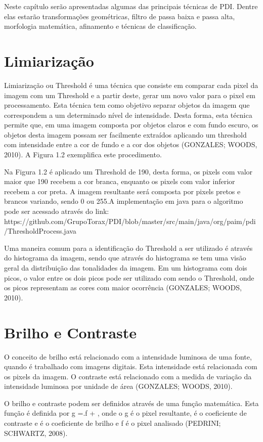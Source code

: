 \documentclass[
	12pt,				%
	oneside,			%
	a4paper,			%
	english,			%
	french,				%
	spanish,			%
	brazil,				%
	]{abntex2}
\begin{document}
Neste capítulo serão apresentadas algumas das principais técnicas de PDI. Dentre elas estarão transformações geométricas, filtro de passa baixa e passa alta, morfologia matemática, afinamento e técnicas de classificação.
\section{Limiarização}

Limiarização ou Threshold é uma técnica que consiste em comparar cada pixel da imagem com um Threshold e a partir deste, gerar um novo valor para o pixel em processamento. Esta técnica tem como objetivo separar objetos da imagem que correspondem a um determinado nível de intensidade. Desta forma, esta técnica permite que, em uma imagem composta por objetos claros e com fundo escuro, os objetos desta imagem possam ser facilmente extraídos aplicando um threshold com intensidade entre a cor de fundo e a cor dos objetos (GONZALES; WOODS, 2010). A Figura 1.2 exemplifica este procedimento.

Na Figura 1.2 é aplicado um Threshold de 190, desta forma, os pixels com valor maior que 190 recebem a cor branca, enquanto os pixels com valor inferior recebem a cor preta. A imagem resultante será composta por pixels pretos e brancos variando, sendo 0 ou 255.A implementação em java para o algoritmo pode ser acessado através do link:
https://github.com/GrupoTorax/PDI/blob/master/src/main/java/org/paim/pdi/ThresholdProcess.java 

Uma maneira comum para a identificação do Threshold a ser utilizado é através do histograma da imagem, sendo que através do histograma se tem uma visão geral da distribuição das tonalidades da imagem. Em um histograma com dois picos, o valor entre os dois picos pode ser utilizado com sendo o Threshold, onde os picos representam as cores com maior ocorrência  (GONZALES; WOODS, 2010). 

\section{Brilho e Contraste}
O conceito de brilho está relacionado com a intensidade luminosa de uma fonte, quando é trabalhado com imagens digitais. Esta intensidade está relacionada com os pixels da imagem. O contraste está relacionado com a medida de variação da intensidade luminosa por unidade de área (GONZALES; WOODS, 2010).

O brilho e contraste podem ser definidos através de uma função matemática. Esta função é definida por g =.f + , onde o g é o pixel resultante,  é o coeficiente de contraste e  é o coeficiente de brilho e f é o pixel analisado (PEDRINI; SCHWARTZ, 2008).
\end{document}
